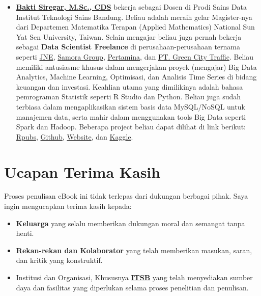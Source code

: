 \documentclass[
]{book}
\providecommand{\tightlist}{%
  \setlength{\itemsep}{0pt}\setlength{\parskip}{0pt}}
\begin{document}
\begin{itemize}
\tightlist
\item
  \textbf{\href{https://www.linkedin.com/in/dsciencelabs/}{Bakti Siregar, M.Sc., CDS}} bekerja sebagai Dosen di Prodi Sains Data Institut Teknologi Sains Bandung. Beliau adalah meraih gelar Magister-nya dari Departemen Matematika Terapan (Applied Mathematics) National Sun Yat Sen University, Taiwan. Selain mengajar beliau juga pernah bekerja sebagai \textbf{Data Scientist Freelance} di perusahaan-perusahaan ternama seperti \href{https://www.jne.co.id/id/beranda}{JNE}, \href{https://www.samoragroup.co.id/home/en}{Samora Group}, \href{https://www.pertamina.com/}{Pertamina}, dan \href{https://ecgoevmoto.com/}{PT. Green City Traffic}. Beliau memiliki antusiasme khusus dalam mengerjakan proyek (mengajar) Big Data Analytics, Machine Learning, Optimisasi, dan Analisis Time Series di bidang keuangan dan investasi. Keahlian utama yang dimilikinya adalah bahasa pemrograman Statistik seperti R Studio dan Python. Beliau juga sudah terbiasa dalam mengaplikasikan sistem basis data MySQL/NoSQL untuk manajemen data, serta mahir dalam menggunakan tools Big Data seperti Spark dan Hadoop. Beberapa project beliau dapat dilihat di link berikut: \href{https://rpubs.com/dsciencelabs}{Rpubs}, \href{https://github.com/dsciencelabs}{Github}, \href{https://dsciencelabs.github.io/web/index.html}{Website}, dan \href{https://www.kaggle.com/baktisiregar/code}{Kaggle}.
\end{itemize}

\section*{Ucapan Terima Kasih}\label{ucapan-terima-kasih}

Proses penulisan eBook ini tidak terlepas dari dukungan berbagai pihak. Saya ingin mengucapkan terima kasih kepada:

\begin{itemize}
\tightlist
\item
  \textbf{Keluarga} yang selalu memberikan dukungan moral dan semangat tanpa henti.
\item
  \textbf{Rekan-rekan dan Kolaborator} yang telah memberikan masukan, saran, dan kritik yang konstruktif.
\item
  Institusi dan Organisasi, Khususnya \textbf{\href{https://itsb.ac.id/}{ITSB}} yang telah menyediakan sumber daya dan fasilitas yang diperlukan selama proses penelitian dan penulisan.
\end{itemize}
\end{document}
